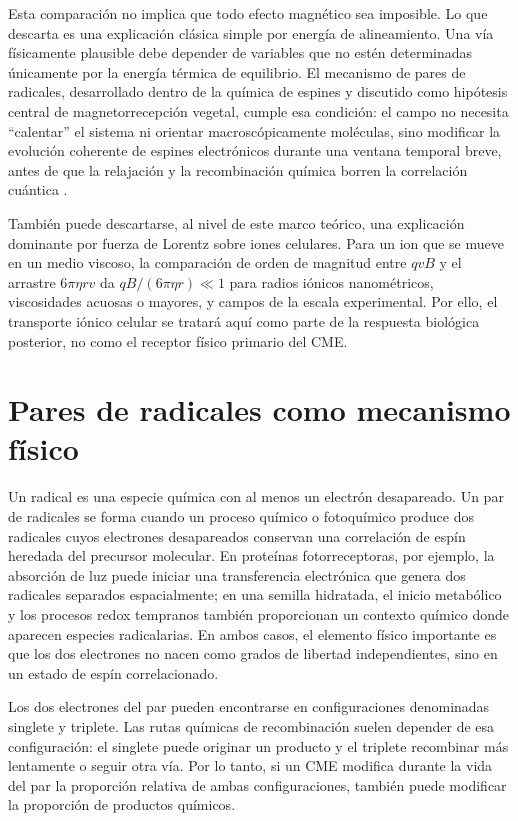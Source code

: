 Esta comparación no implica que todo efecto magnético sea imposible. Lo que descarta es una explicación clásica simple por energía de alineamiento. Una vía físicamente plausible debe depender de variables que no estén determinadas únicamente por la energía térmica de equilibrio. El mecanismo de pares de radicales, desarrollado dentro de la química de espines y discutido como hipótesis central de magnetorrecepción vegetal, cumple esa condición: el campo no necesita ``calentar'' el sistema ni orientar macroscópicamente moléculas, sino modificar la evolución coherente de espines electrónicos durante una ventana temporal breve, antes de que la relajación y la recombinación química borren la correlación cuántica \cite{maffei_2022,saletnik_2022_static}.

También puede descartarse, al nivel de este marco teórico, una explicación dominante por fuerza de Lorentz sobre iones celulares. Para un ion que se mueve en un medio viscoso, la comparación de orden de magnitud entre $qvB$ y el arrastre $6\pi\eta r v$ da $qB/(6\pi\eta r)\ll1$ para radios iónicos nanométricos, viscosidades acuosas o mayores, y campos de la escala experimental. Por ello, el transporte iónico celular se tratará aquí como parte de la respuesta biológica posterior, no como el receptor físico primario del CME.

\section{Pares de radicales como mecanismo físico}
\label{sec:mecanismo_rpm}

Un radical es una especie química con al menos un electrón desapareado. Un par de radicales se forma cuando un proceso químico o fotoquímico produce dos radicales cuyos electrones desapareados conservan una correlación de espín heredada del precursor molecular. En proteínas fotorreceptoras, por ejemplo, la absorción de luz puede iniciar una transferencia electrónica que genera dos radicales separados espacialmente; en una semilla hidratada, el inicio metabólico y los procesos redox tempranos también proporcionan un contexto químico donde aparecen especies radicalarias. En ambos casos, el elemento físico importante es que los dos electrones no nacen como grados de libertad independientes, sino en un estado de espín correlacionado.

Los dos electrones del par pueden encontrarse en configuraciones denominadas singlete y triplete. Las rutas químicas de recombinación suelen depender de esa configuración: el singlete puede originar un producto y el triplete recombinar más lentamente o seguir otra vía. Por lo tanto, si un CME modifica durante la vida del par la proporción relativa de ambas configuraciones, también puede modificar la proporción de productos químicos.

